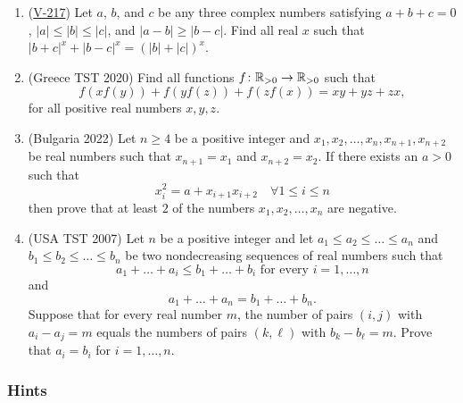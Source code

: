 \documentclass[11pt,paper=letter]{scrartcl}
\begin{document}
\begin{enumerate}[resume]

\item (\href{https://artofproblemsolving.com/community/c6h2647374p22910593}{V-217}) Let $a$, $b$, and $c$ be any three complex numbers satisfying $a + b + c = 0$, $|a| \le |b| \le |c|$, and $|a - b| \ge |b - c|$. Find all real $x$ such that $|b + c|^x + |b - c|^x = \left( |b| + |c| \right)^{x}$.
\hints{\ref{h:5} \ref{h:6}}

\item (Greece TST 2020) Find all functions $f \colon \mathbb R_{>0} \to \mathbb R_{>0}$ such that \[
  f(xf(y))+f(yf(z))+f(zf(x))=xy+yz+zx,\]
for all positive real numbers $x, y, z$.
\hint{\ref{h:7}}

\item (Bulgaria 2022) Let $n\geq 4$ be a positive integer and $x_{1},x_{2},\ldots ,x_{n},x_{n+1},x_{n+2}$ be real numbers such that $x_{n+1}=x_{1}$ and $x_{n+2}=x_{2}$. If there exists an $a>0$ such that
\[x_{i}^2=a+x_{i+1}x_{i+2}\quad\forall 1\leq i\leq n\]then prove that at least $2$ of the numbers $x_{1},x_{2},\ldots ,x_{n}$ are negative.
\hints{\ref{h:8} \ref{h:9}}


\item (USA TST 2007) Let $n$ be a positive integer and let $a_1 \le a_2 \le \dots \le a_n$ and $b_1 \le b_2 \le \dots \le b_n$ be two nondecreasing sequences of real numbers such that
\[ a_1 + \dots + a_i \le b_1 + \dots + b_i \text{ for every } i = 1, \dots, n \]
and
\[ a_1 + \dots + a_n = b_1 + \dots + b_n. \]
Suppose that for every real number $m$, the number of pairs $(i,j)$ with $a_i-a_j=m$ equals the numbers of pairs $(k,\ell)$ with $b_k-b_\ell = m$. Prove that $a_i = b_i$ for $i=1,\dots,n$.
\hint{\ref{h:10}}

\end{enumerate}

\subsubsection*{Hints}
\end{document}
